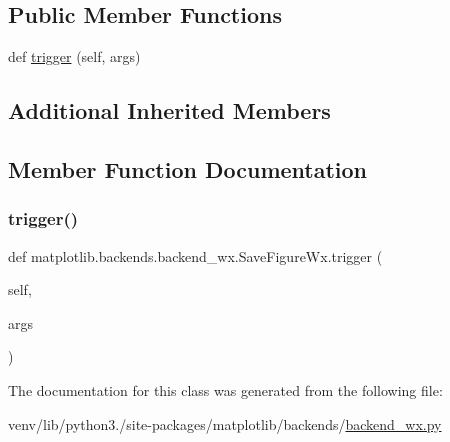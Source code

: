 \subsection*{Public Member Functions}
\begin{DoxyCompactItemize}
\item 
def \hyperlink{classmatplotlib_1_1backends_1_1backend__wx_1_1SaveFigureWx_a15fa7b83c041cce2263bbbfb3c38f8f1}{trigger} (self, args)
\end{DoxyCompactItemize}
\subsection*{Additional Inherited Members}


\subsection{Member Function Documentation}
\mbox{\label{classmatplotlib_1_1backends_1_1backend__wx_1_1SaveFigureWx_a15fa7b83c041cce2263bbbfb3c38f8f1}} 
\subsubsection{\texorpdfstring{trigger()}{trigger()}}
{\footnotesize\ttfamily def matplotlib.\+backends.\+backend\+\_\+wx.\+Save\+Figure\+Wx.\+trigger (\begin{DoxyParamCaption}\item[{}]{self,  }\item[{}]{args }\end{DoxyParamCaption})}



The documentation for this class was generated from the following file\+:\begin{DoxyCompactItemize}
\item 
venv/lib/python3./site-\/packages/matplotlib/backends/\hyperlink{backend__wx_8py}{backend\+\_\+wx.\+py}\end{DoxyCompactItemize}
